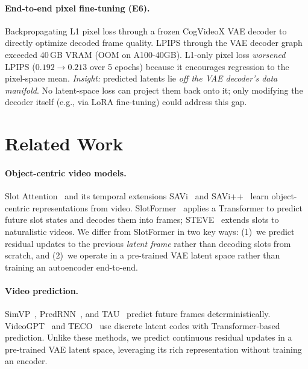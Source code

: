 \documentclass{article}
\begin{document}
\paragraph{End-to-end pixel fine-tuning (E6).}
Backpropagating L1 pixel loss through a frozen CogVideoX VAE decoder
to directly optimize decoded frame quality.
LPIPS through the VAE decoder graph exceeded 40\,GB VRAM (OOM on
A100-40GB).
L1-only pixel loss \emph{worsened} LPIPS ($0.192 \to 0.213$ over 5
epochs) because it encourages regression to the pixel-space mean.
\textit{Insight:} predicted latents lie \emph{off the VAE decoder's
data manifold}.
No latent-space loss can project them back onto it; only modifying the
decoder itself (e.g., via LoRA fine-tuning) could address this gap.

\section{Related Work}
\label{sec:related}

\paragraph{Object-centric video models.}
Slot Attention~\cite{locatello2020object} and its temporal extensions
SAVi~\cite{kipf2022conditional} and SAVi++~\cite{elsayed2022savi++}
learn object-centric representations from video.
SlotFormer~\cite{wu2023slotformer} applies a Transformer to predict
future slot states and decodes them into frames; STEVE~\cite{singh2022steve}
extends slots to naturalistic videos.
We differ from SlotFormer in two key ways: (1)~we predict residual
updates to the previous \emph{latent frame} rather than decoding
slots from scratch, and (2)~we operate in a pre-trained VAE latent
space rather than training an autoencoder end-to-end.

\paragraph{Video prediction.}
SimVP~\cite{gao2022simvp}, PredRNN~\cite{wang2022predrnn}, and
TAU~\cite{tan2023temporal} predict future frames deterministically.
VideoGPT~\cite{yan2021videogpt} and TECO~\cite{yan2023teco}
use discrete latent codes with Transformer-based prediction.
Unlike these methods, we predict continuous residual updates in a
pre-trained VAE latent space, leveraging its rich representation
without training an encoder.
\end{document}
